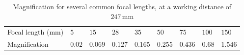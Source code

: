 \begin{table}[!h]
  \centering
  \caption[Magnification for several common focal lengths]{Magnification for several common focal lengths, at a working distance of $247\,\mathrm{mm}$}
  \label{tab:lens_magnification}
  \begin{tabularx}{1\textwidth}{lllllllll}
    \toprule
    Focal length ($\mathrm{mm}$) & $5$    & $15$    & $28$    & $35$    & $50$    & $75$    & $100$  & $150$   \\
    Magnification     & $0.02$ & $0.069$ & $0.127$ & $0.165$ & $0.255$ & $0.436$ & $0.68$ & $1.546$ \\
    \bottomrule
  \end{tabularx}
\end{table}